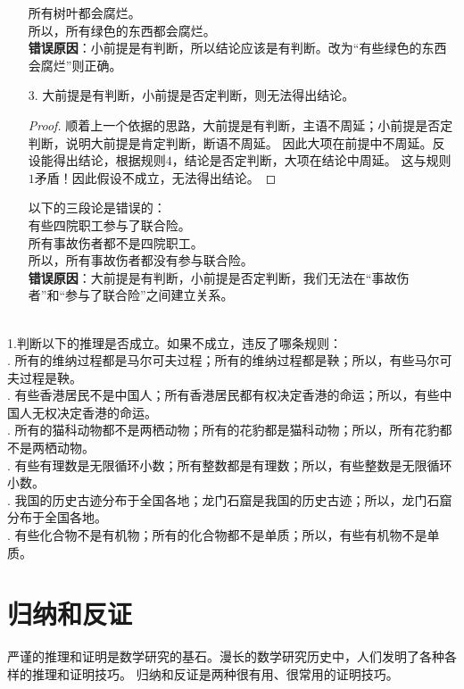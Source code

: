 \begin{enumerate}
\begin{ex*}
        \indent 所有树叶都会腐烂。\\
        \indent 所以，所有绿色的东西都会腐烂。\\
        \textbf{错误原因}：小前提是有判断，所以结论应该是有判断。改为“有些绿色的东西会腐烂”则正确。
    \end{ex*}
    \item[3.] 大前提是有判断，小前提是否定判断，则无法得出结论。
    \begin{proof}
        顺着上一个依据的思路，大前提是有判断，主语不周延；小前提是否定判断，说明大前提是肯定判断，断语不周延。
        因此大项在前提中不周延。反设能得出结论，根据规则$4$，结论是否定判断，大项在结论中周延。
        这与规则$1$矛盾！因此假设不成立，无法得出结论。
    \end{proof}
    \begin{ex*}
        以下的三段论是错误的： \\
        \indent 有些四院职工参与了联合险。\\
        \indent 所有事故伤者都不是四院职工。\\
        \indent 所以，所有事故伤者都没有参与联合险。\\
        \textbf{错误原因}：大前提是有判断，小前提是否定判断，我们无法在“事故伤者”和“参与了联合险”之间建立关系。
    \end{ex*}
\end{enumerate}
\begin{xt}\label{xt:0-1-10}
    \mbox{} \\
    \indent 1.判断以下的推理是否成立。如果不成立，违反了哪条规则：\\
    . 所有的维纳过程都是马尔可夫过程；所有的维纳过程都是鞅；所以，有些马尔可夫过程是鞅。\\
    . 有些香港居民不是中国人；所有香港居民都有权决定香港的命运；所以，有些中国人无权决定香港的命运。\\
    . 所有的猫科动物都不是两栖动物；所有的花豹都是猫科动物；所以，所有花豹都不是两栖动物。\\
    . 有些有理数是无限循环小数；所有整数都是有理数；所以，有些整数是无限循环小数。\\
    . 我国的历史古迹分布于全国各地；龙门石窟是我国的历史古迹；所以，龙门石窟分布于全国各地。\\
    . 有些化合物不是有机物；所有的化合物都不是单质；所以，有些有机物不是单质。    
\end{xt}

\chapter{归纳和反证}  %
严谨的推理和证明是数学研究的基石。漫长的数学研究历史中，人们发明了各种各样的推理和证明技巧。
归纳和反证是两种很有用、很常用的证明技巧。

